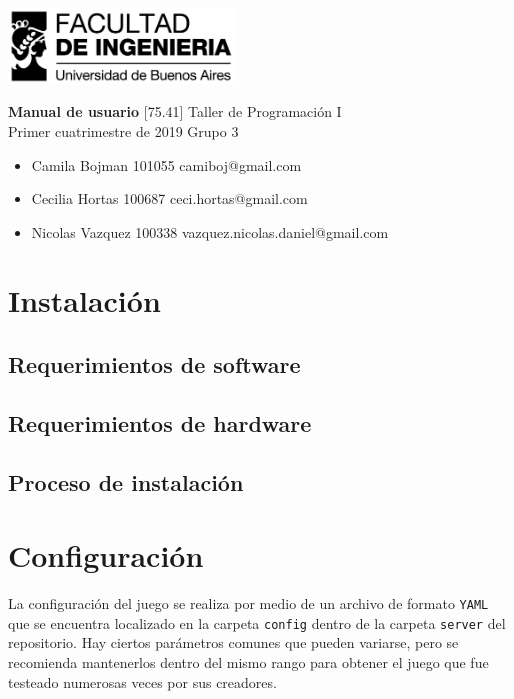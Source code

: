 \documentclass[a4paper]{article}
\newcommand{\materia}{[75.41] Taller de Programación I}
\newcommand{\trabajo}{Manual de usuario}
\newcommand{\cuatrimestre}{Primer cuatrimestre de 2019}
\newcommand{\grupo}{Grupo 3}
\begin{document}
	\setcounter{page}{1}
	
	\begin{titlepage}
		\hfill\includegraphics[width=6cm]{fiuba.jpeg}
		\begin{center}
			\vfill
			\Huge \textbf{\trabajo}
			\vskip2cm
			\Large \materia\\
			\cuatrimestre
			\vfill
			\grupo
			\begin{itemize}
				\item Camila Bojman 101055 camiboj@gmail.com
				\item Cecilia Hortas 100687 ceci.hortas@gmail.com
				\item Nicolas Vazquez 100338 vazquez.nicolas.daniel@gmail.com
			\end{itemize}
			\vskip1cm
		\end{center}
	\end{titlepage}

\section{Instalación}

\subsection{Requerimientos de software}

\subsection{Requerimientos de hardware}

\subsection{Proceso de instalación}

\section{Configuración}

La configuración del juego se realiza por medio de un archivo de formato \texttt{YAML} que se encuentra localizado en la carpeta \texttt{config} dentro de la carpeta \texttt{server} del repositorio. Hay ciertos parámetros comunes que pueden variarse, pero se recomienda mantenerlos dentro del mismo rango para obtener el juego que fue testeado numerosas veces por sus creadores.
\end{document}
